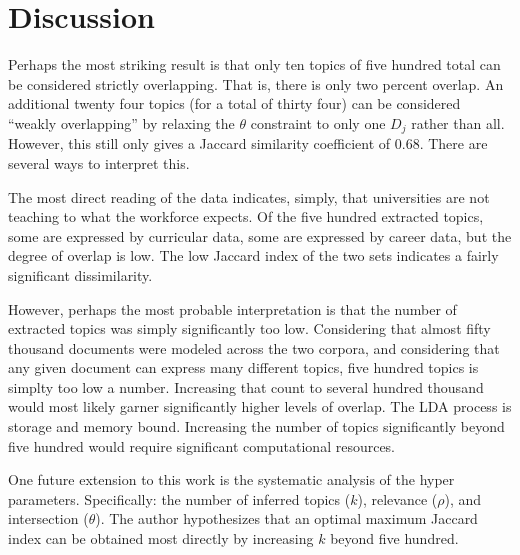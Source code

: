 \section{Discussion}

Perhaps the most striking result is that only ten topics of five hundred total can be considered strictly overlapping.
That is, there is only two percent overlap.
An additional twenty four topics (for a total of thirty four) can be considered ``weakly overlapping'' by relaxing the $\theta$ constraint to only one $D_j$ rather than all.
However, this still only gives a Jaccard similarity coefficient of 0.68.
There are several ways to interpret this.

The most direct reading of the data indicates, simply, that universities are not teaching to what the workforce expects.
Of the five hundred extracted topics, some are expressed by curricular data, some are expressed by career data, but the degree of overlap is low.
The low Jaccard index of the two sets indicates a fairly significant dissimilarity.

However, perhaps the most probable interpretation is that the number of extracted topics was simply significantly too low.
Considering that almost fifty thousand documents were modeled across the two corpora, and considering that any given document can express many different topics, five hundred topics is simplty too low a number.
Increasing that count to several hundred thousand would most likely garner significantly higher levels of overlap.
The LDA process is storage and memory bound.
Increasing the number of topics significantly beyond five hundred would require significant computational resources.

One future extension to this work is the systematic analysis of the hyper parameters.
Specifically: the number of inferred topics ($k$), relevance ($\rho$), and intersection ($\theta$).
The author hypothesizes that an optimal maximum Jaccard index can be obtained most directly by increasing $k$ beyond five hundred.
